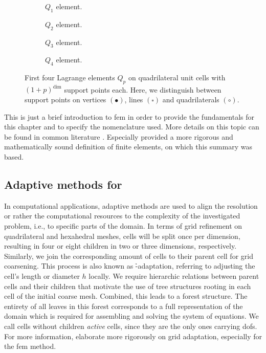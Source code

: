 \begin{figure}
\begin{subfigure}{.24\textwidth}
  \centering
  
  \caption{$Q_1$ element.}
\end{subfigure}
\begin{subfigure}{.24\textwidth}
  \centering
  
  \caption{$Q_2$ element.}
\end{subfigure}
\begin{subfigure}{.24\textwidth}
  \centering
  
  \caption{$Q_3$ element.}
\end{subfigure}
\begin{subfigure}{.24\textwidth}
  \centering
  
  \caption{$Q_4$ element.}
\end{subfigure}
\caption[Lagrange elements $Q_p$ on quadrilateral unit cells.]{First four Lagrange elements $Q_p$ on quadrilateral unit cells with $(1+p)^\text{dim}$ support points each. Here, we distinguish between support points on vertices $(\bullet)$, lines $(\square)$ and quadrilaterals $(\circ)$.}
\label{fig:lagrange}
\end{figure}

This is just a brief introduction to \gls{fem} in order to provide the fundamentals for this chapter and to specify the nomenclature used. More details on this topic can be found in common literature \parencite[e.g.,][]{quarteroni1994, ern2004, elman2014}. Especially \textcite{brenner2008} provided a more rigorous and mathematically sound definition of finite elements, on which this summary was based.


\subsection{Adaptive methods for }

In computational applications, adaptive methods are used to align the resolution or rather the computational resources to the complexity of the investigated problem, i.e., to specific parts of the domain. In terms of grid refinement on quadrilateral and hexahedral meshes, cells will be split once per dimension, resulting in four or eight children in two or three dimensions, respectively. Similarly, we join the corresponding amount of cells to their parent cell for grid coarsening. This process is also known as \h-adaptation, referring to adjusting the cell's length or diameter \(h\) locally. We require hierarchic relations between parent cells and their children that motivate the use of tree structures rooting in each cell of the initial coarse mesh. Combined, this leads to a forest structure. The entirety of all leaves in this forest corresponds to a full representation of the domain which is required for assembling and solving the system of equations. We call cells without children \textit{active} cells, since they are the only ones carrying \glspl{dof}. For more information, \textcite{bangerth2003} elaborate more rigorously on grid adaptation, especially for the \gls{fem} method.

